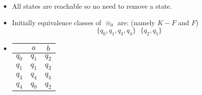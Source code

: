 \documentclass[12pt]{article}
\begin{document}
\begin{itemize}
    \item All states are reachable so no need to remove a state.
    \item Initially equivalence classes of $\equiv_0$ are: (namely $K - F$ and $F$) $$\{q_0,q_1,q_3,q_4\} \text{  } \{q_2,q_5\}$$
    \item 
        \begin{tabular}{c|c c}
             & $a$ & $b$\\
            \hline
            $q_0$ & $q_1$ & $q_2$ \\
            $q_1$ & $q_1$ & $q_2$ \\
            $q_3$ & $q_4$ & $q_5 $\\
            $q_4$ & $q_0$ & $q_2$
        \end{tabular}


\end{itemize}
\end{document}
